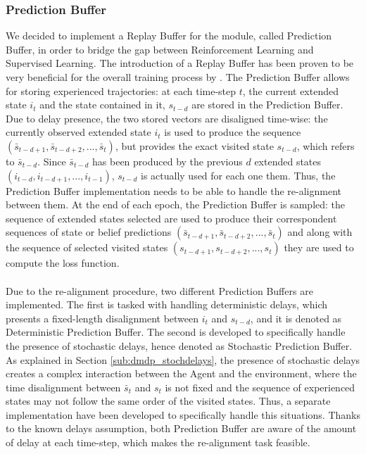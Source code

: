             \subsubsection{Prediction Buffer}
                We decided to implement a Replay Buffer for the module, called Prediction Buffer, in order to bridge the gap between Reinforcement Learning and Supervised Learning. The introduction of a Replay Buffer has been proven to be very beneficial for the overall training process by .
                The Prediction Buffer allows for storing experienced trajectories: at each time-step $t$, the current extended state $i_t$ and the state contained in it, $s_{t-d}$ are stored in the Prediction Buffer. Due to delay presence, the two stored vectors are disaligned time-wise: the currently observed extended state $i_t$ is used to produce the sequence $(\bar{s}_{t-d+1}, \bar{s}_{t-d+2}, ..., \bar{s}_t)$, but provides the exact visited state $s_{t-d}$, which refers to $\bar{s}_{t-d}$. Since $\bar{s}_{t-d}$ has been produced by the previous $d$ extended states $(i_{t-d}, i_{t-d+1}, ..., i_{t-1})$, $s_{t-d}$ is actually used for each one them. Thus, the Prediction Buffer implementation needs to be able to handle the re-alignment between them. At the end of each epoch, the Prediction Buffer is sampled: the sequence of extended states selected are used to produce their correspondent sequences of state or belief predictions $(\bar{s}_{t-d+1}, \bar{s}_{t-d+2}, ..., \bar{s}_t)$ and along with the sequence of selected visited states $(s_{t-d+1}, s_{t-d+2}, ..., s_t)$ they are used to compute the loss function.
                \\\\
                Due to the re-alignment procedure, two different Prediction Buffers are implemented. The first is tasked with handling deterministic delays, which presents a fixed-length disalignment between $i_t$ and $s_{t-d}$, and it is denoted as Deterministic Prediction Buffer. The second is developed to specifically handle the presence of stochastic delays, hence denoted as Stochastic Prediction Buffer. As explained in Section \ref{sub:dmdp_stochdelays}, the presence of stochastic delays creates a complex interaction between the Agent and the environment, where the time disalignment between $\bar{s}_t$ and $s_t$ is not fixed and the sequence of experienced states may not follow the same order of the visited states. Thus, a separate implementation have been developed to specifically handle this situations. Thanks to the known delays assumption, both Prediction Buffer are aware of the amount of delay at each time-step, which makes the re-alignment task feasible.
